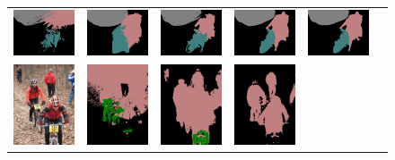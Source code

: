 \begin{figure}[p]
{\begin{tabular}{c c c c c c}
    \includegraphics[height=0.122\linewidth]{fig/val_crf_vis/adaweak/2011_002322.png} &
    \includegraphics[height=0.122\linewidth]{fig/val_crf_vis/bbox/2011_002322.png} &
    \includegraphics[height=0.122\linewidth]{fig/val_crf_vis/bbox_crf/2011_002322.png} &
    \includegraphics[height=0.122\linewidth]{fig/val_crf_vis/strongweak/2011_002322.png} &
    \includegraphics[height=0.122\linewidth]{fig/val_crf_vis/cocomix/2011_002322.png} \\
    \includegraphics[height=0.13\linewidth]{fig/val_crf_vis/img/2007_001630.jpg} &
    \includegraphics[height=0.13\linewidth]{fig/val_crf_vis/adaweak/2007_001630.png} &
    \includegraphics[height=0.13\linewidth]{fig/val_crf_vis/bbox/2007_001630.png} &
    \includegraphics[height=0.13\linewidth]{fig/val_crf_vis/bbox_crf/2007_001630.png} &

\end{tabular}}
\end{figure}

